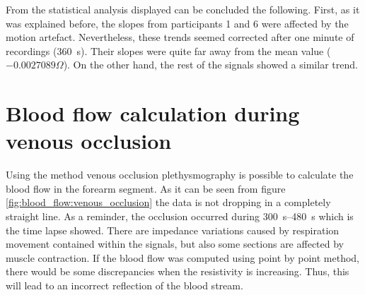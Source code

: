 From the statistical analysis displayed can be concluded the following. First, as it was explained before, the slopes from participants 1 and 6 were affected by the motion artefact. Nevertheless, these trends seemed corrected after one minute of recordings (\SI{360}{\second}). Their slopes were quite far away from the mean value ($-0.0027089 \Omega$). On the other hand, the rest of the signals showed a similar trend. 



\section{Blood flow calculation during venous occlusion}
\label{section5.2}
Using the method venous occlusion plethysmography is possible to calculate the blood flow in the forearm segment. As it can be seen from figure \ref{fig:blood_flow:venous_occlusion} the data is not dropping in a completely straight line. As a reminder, the occlusion occurred during \SIrange{300}{480}{\second} which is the time lapse showed. There are impedance variations caused by respiration movement contained within the signals, but also some sections are affected by muscle contraction. If the blood flow was computed using point by point method, there would be some discrepancies when the resistivity is increasing. Thus, this will lead to an incorrect reflection of the blood stream. 


